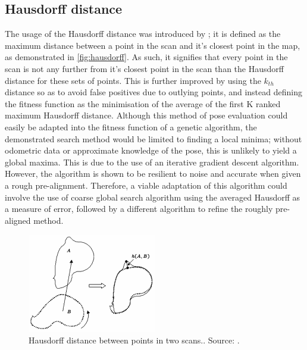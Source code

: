 \documentclass[authoryearcitations]{UoYCSproject}
\begin{document}
\subsection{Hausdorff distance}
The usage of the Hausdorff distance was introduced by \citet{Donoso-Aguirre2008-pb}; it is defined as the maximum distance between a point in the scan and it's closest point in the map, as demonstrated in \autoref{fig:hausdorff}. As such, it signifies that every point in the scan is not any further from it's closest point in the scan than the Hausdorff distance for these sets of points. This is further improved by using the $k_{th}$ distance so as to avoid false positives due to outlying points, and instead defining the fitness function as the minimisation of the average of the first K ranked maximum Hausdorff distance. Although this method of pose evaluation could easily be adapted into the fitness function of a genetic algorithm, the demonstrated search method would be limited to finding a local minima; without odometric data or approximate knowledge of the pose, this is unlikely to yield a global maxima. This is due to the use of an iterative gradient descent algorithm. However, the algorithm is shown to be resilient to noise and accurate when given a rough pre-alignment. Therefore, a viable adaptation of this algorithm could involve the use of coarse global search algorithm using the averaged Hausdorff as a measure of error, followed by a different algorithm to refine the roughly pre-aligned method.

\begin{figure}[t]
	\centering
	\includegraphics[width=0.5\textwidth,keepaspectratio]{images/hausdorff.png}

	\caption[Hausdorff distance]{Hausdorff distance between points in two scans.. Source: \citet{Donoso-Aguirre2008-pb}.}
	\label{fig:hausdorff}
\end{figure}
\end{document}
